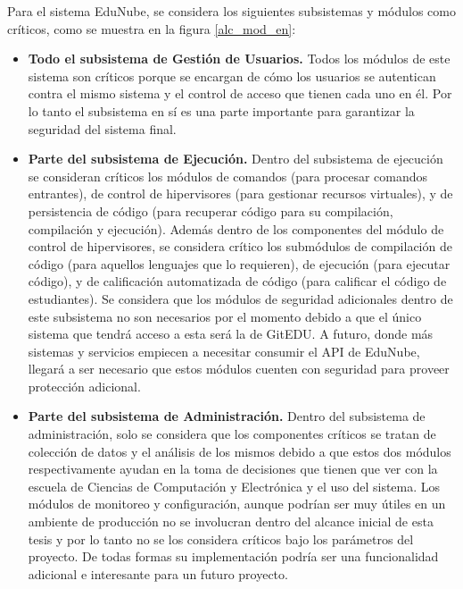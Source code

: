 Para el sistema EduNube, se considera los siguientes subsistemas y módulos como críticos, como se muestra en la figura \ref{alc_mod_en}:
\begin{itemize}
	\item \textbf{Todo el subsistema de Gestión de Usuarios.} Todos los módulos de este sistema son críticos porque se encargan de cómo los usuarios se autentican contra el mismo sistema y el control de acceso que tienen cada uno en él. Por lo tanto el subsistema en sí es una parte importante para garantizar la seguridad del sistema final.
	\item \textbf{Parte del subsistema de Ejecución.} Dentro del subsistema de ejecución se consideran críticos los módulos de comandos (para procesar comandos entrantes), de control de hipervisores (para gestionar recursos virtuales), y de persistencia de código (para recuperar código para su compilación, compilación y ejecución).  Además dentro de los componentes del módulo de control de hipervisores, se considera crítico los submódulos de compilación de código (para aquellos lenguajes que lo requieren), de ejecución (para ejecutar código), y de calificación automatizada de código (para calificar el código de estudiantes). Se considera que los módulos de seguridad adicionales dentro de este subsistema no son necesarios por el momento debido a que el único sistema que tendrá acceso a esta será la de GitEDU. A futuro, donde más sistemas y servicios empiecen a necesitar consumir el API de EduNube, llegará a ser necesario que estos módulos cuenten con seguridad para proveer protección adicional.
	\item \textbf{Parte del subsistema de Administración.} Dentro del subsistema de administración, solo se considera que los componentes críticos se tratan de colección de datos y el análisis de los mismos debido a que estos dos módulos respectivamente ayudan en la toma de decisiones que tienen que ver con la escuela de Ciencias de Computación y Electrónica y el uso del sistema. Los módulos de monitoreo y configuración, aunque podrían ser muy útiles en un ambiente de producción no se involucran dentro del alcance inicial de esta tesis y por lo tanto no se los considera críticos bajo los parámetros del proyecto. De todas formas su implementación podría ser una funcionalidad adicional e interesante para un futuro proyecto.
\end{itemize}


